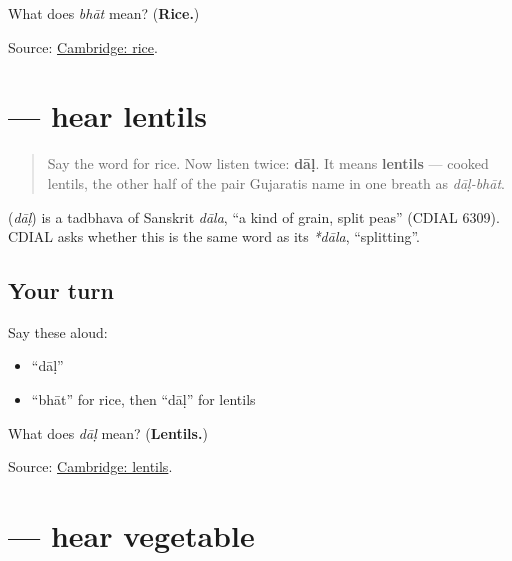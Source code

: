 \begin{tcolorbox}[breakable,colback=teal!4,colframe=teal!35!black,title={Before you move on}]
What does \emph{bhāt} mean? (\textbf{Rice.})

Source: \href{https://dictionary.cambridge.org/dictionary/english-gujarati/rice}{Cambridge: rice}.
\end{tcolorbox}
\section[\texorpdfstring{\gu{દાળ} (dāḷ)}{દાળ (dāḷ)}]{ — hear lentils}

\label{lesson:GU-C27-hear-daal}



\begin{quote}
Say the word for rice. Now listen twice: \textbf{dāḷ}. It means \textbf{lentils} — cooked lentils, the other half of the pair Gujaratis name in one breath as \emph{dāḷ-bhāt}.
\end{quote}

\begin{cousinweb}
\textbf{} (\emph{dāḷ}) is a tadbhava of Sanskrit \emph{dāla}, \textquotedblleft{}a kind of grain, split peas\textquotedblright{} (CDIAL 6309). CDIAL asks whether this is the same word as its \emph{*dāla}, \textquotedblleft{}splitting\textquotedblright{}.
\end{cousinweb}

\subsection*{Your turn}
Say these aloud:

\begin{itemize}
\raggedright
  \item \textquotedblleft{}dāḷ\textquotedblright{}
  \item \textquotedblleft{}bhāt\textquotedblright{} for rice, then \textquotedblleft{}dāḷ\textquotedblright{} for lentils
\end{itemize}

\begin{tcolorbox}[breakable,colback=teal!4,colframe=teal!35!black,title={Before you move on}]
What does \emph{dāḷ} mean? (\textbf{Lentils.})

Source: \href{https://dictionary.cambridge.org/dictionary/english-gujarati/lentil}{Cambridge: lentils}.
\end{tcolorbox}
\section[\texorpdfstring{\gu{શાક} (shāk)}{શાક (shāk)}]{ — hear vegetable}

